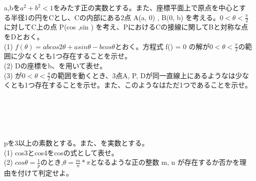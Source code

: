 \documentclass{ltjsarticle}
\begin{document}
a,bを$a^2+b^2<1$をみたす正の実数とする。また、座標平面上で原点を中心とする半径1の円をCとし、Cの内部にある2点 A(a, 0) , B(0, b) を考える。$ 0 < \theta  < \frac{\pi}{2} $に対してC上の点 P(cos \theta ,sin \theta) を考え、PにおけるCの接線に関してBと対称な点をDとおく。\\
(1) $ f(\theta ) = abcos 2 \theta  + asin \theta  - bcos \theta $とおく。方程式 f(\theta ) = 0 の解が$ 0 < \theta  < \frac{\pi}{2} $の範囲に少なくとも1つ存在することを示せ。\\
(2) Dの座標をb、\theta を用いて表せ。\\
(3) \theta が$ 0 < \theta < \frac{\pi}{2} $の範囲を動くとき、3点A, P, Dが同一直線上にあるような\theta は少なくとも1つ存在することを示せ。また、このような\theta はただ1つであることを示せ。\\
\\
\\
\\
\\
\\
pを3以上の素数とする。また、\theta を実数とする。\\
(1) cos3\theta とcos4\theta をcos\theta の式として表せ。\\
(2) $ cos\theta  = \frac{1}{p} $のとき,$ \theta = \frac{m}{n}*\pi $となるような正の整数 m, n が存在するか否かを理由を付けて判定せよ。
\end{document}
